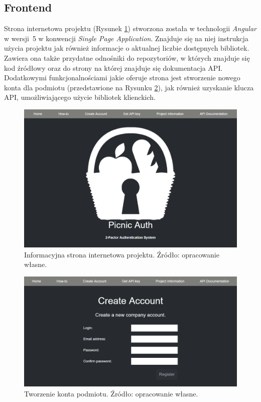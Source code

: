 \subsection{Frontend}
Strona internetowa projektu (Rysunek \ref{front-home}) stworzona została w technologii \textit{Angular} w wersji~5 w konwencji 
\textit{Single Page Application}. Znajduje się na niej instrukcja użycia projektu jak również informacje
o aktualnej liczbie dostępnych bibliotek. Zawiera ona także przydatne odnośniki do repozytoriów, w których
znajduje się kod źródłowy oraz do strony na której znajduje się dokumentacja API. \\
Dodatkowymi funkcjonalnościami jakie oferuje strona jest stworzenie nowego konta dla podmiotu 
(przedstawione na Rysunku \ref{front-create}), jak również uzyskanie klucza API, 
umożliwiającego użycie bibliotek klienckich.
\begin{figure}[t]
    \centering
	\includegraphics[width=\textwidth]{content/images/front-home}
    \caption{Informacyjna strona internetowa projektu. Źródło: opracowanie własne.}
    \label{front-home}
\end{figure}
\begin{figure}[t]
    \centering
	\includegraphics[width=\textwidth]{content/images/front-create}
    \caption{Tworzenie konta podmiotu. Źródło: opracowanie własne.}
    \label{front-create}
\end{figure}

